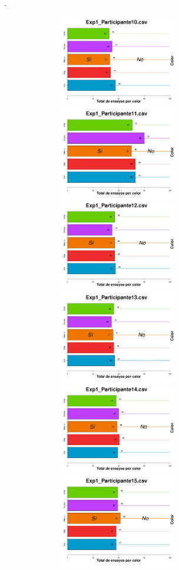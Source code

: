 \documentclass[a4paper ]{article}
\begin{document}
\vfill .
\begin{figure}[th]
\begin{center}
\includegraphics[width=8cm, height=4cm]{Figures/BiasColor_Exp1_P10} \includegraphics[width=8cm, height=4cm]{Figures/BiasColor_Exp1_P11} \includegraphics[width=8cm, height=4cm]{Figures/BiasColor_Exp1_P12}
\includegraphics[width=8cm, height=4cm]{Figures/BiasColor_Exp1_P13} \includegraphics[width=8cm, height=4cm]{Figures/BiasColor_Exp1_P14} \includegraphics[width=8cm, height=4cm]{Figures/BiasColor_Exp1_P15}

\end{center}
\end{figure}
\end{document}
